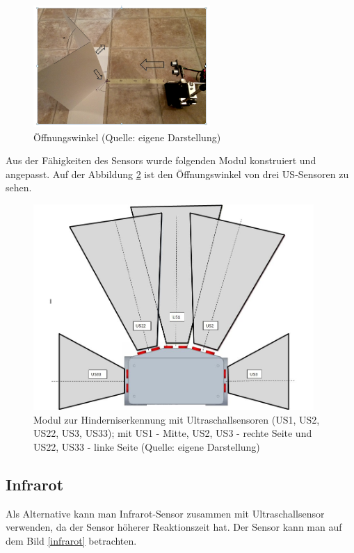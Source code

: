 \begin{figure}[!h]  %
	\centering\includegraphics[width=0.6\textwidth]{images/Bild-7.png}
	\caption{Öffnungswinkel (Quelle: eigene Darstellung)}
	\label{bild_7} %
\end{figure}

Aus der Fähigkeiten des Sensors wurde folgenden Modul konstruiert und angepasst. Auf der Abbildung \ref{H-Mod} ist den Öffnungswinkel von drei US-Sensoren zu sehen.

\begin{figure}[!h]  %
	\centering\includegraphics[width=0.95\textwidth]{images/H-Mod.jpg}
	\caption{Modul zur Hinderniserkennung mit Ultraschallsensoren (US1, US2, US22, US3, US33); mit US1 - Mitte, US2, US3 - rechte Seite und US22, US33 - linke Seite  (Quelle: eigene Darstellung)}
	\label{H-Mod} 
\end{figure}

\subsection{Infrarot}
Als Alternative kann man Infrarot-Sensor zusammen mit Ultraschallsensor verwenden, da der Sensor höherer Reaktionszeit hat. Der Sensor kann man auf dem  Bild \ref{infrarot} betrachten.

